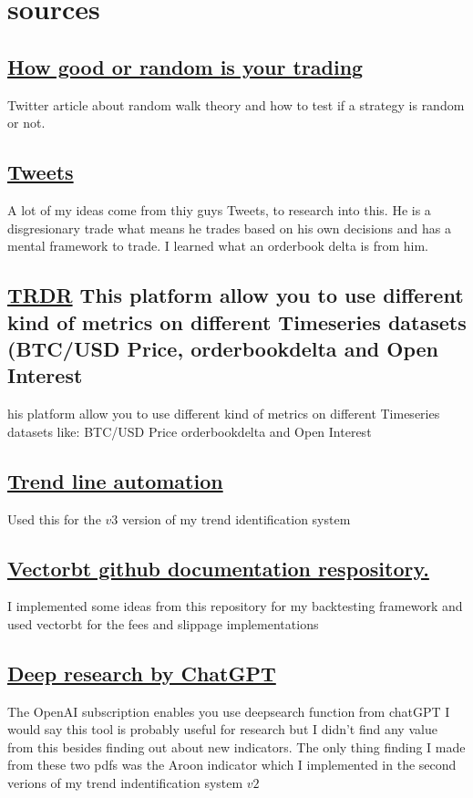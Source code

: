 \documentclass[12pt]{article}
\begin{document}
\newpage
\section{sources}
\subsection{\href{https://x.com/HangukQuant/status/1930603876069335120}{How good or random is your trading}}
Twitter article about random walk theory and how to test if a strategy is random or not. 
\subsection{\href{https://x.com/abetrade/status/1941613701150188008}{Tweets}}
A lot of my ideas come from thiy guys Tweets, to research into this. He is a disgresionary trade what means he trades based on his own decisions and has a mental framework to trade. I learned what an orderbook delta is from him.
\subsection{\href{https://trdr.io/}{TRDR} This platform allow you to use different kind of metrics on different Timeseries datasets (BTC/USD Price, orderbookdelta  and Open Interest}his platform allow you to use different kind of metrics on different Timeseries datasets like: BTC/USD Price orderbookdelta  and Open Interest
\subsection{\href{https://github.com/neurotrader888/TrendLineAutomation}{Trend line automation}} Used this for the $v3$ version of my trend identification system
\subsection{\href{https://github.com/polakowo/vectorbt}{Vectorbt github documentation respository.}} I implemented some ideas from this repository for my backtesting framework and used vectorbt for the fees and slippage implementations


\subsection{\href{https://github.com/AJslashTracey/deep_research_chatGPT_03}{Deep research by ChatGPT}}
The OpenAI subscription enables you use deepsearch function from chatGPT I would say this tool is probably useful for research but I didn't find any value from this besides finding out about new indicators. The only thing finding I made from these two pdfs was the Aroon indicator which I implemented in the second verions of my trend indentification system $v2$
\end{document}
